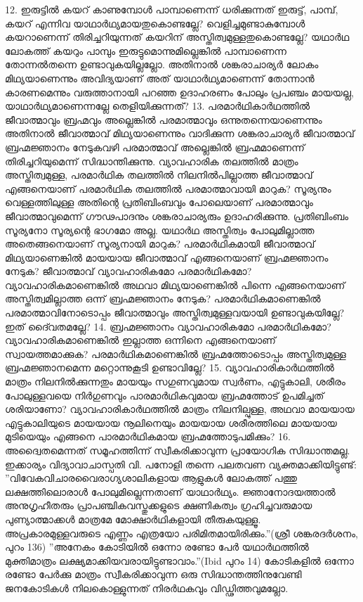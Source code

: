 12. ഇരുട്ടില്‍ കയറ് കാണുമ്പോള്‍ പാമ്പാണെന്ന് ധരിക്കുന്നത് ഇരുട്ട്, പാമ്പ്, കയറ് എന്നിവ യാഥാര്‍ഥ്യമായതുകൊണ്ടല്ലേ? വെളിച്ചമുണ്ടാകുമ്പോള്‍ കയറാണെന്ന് തിരിച്ചറിയുന്നത് കയറിന് അസ്തിത്വമുള്ളതുകൊണ്ടല്ലേ? യഥാര്‍ഥ ലോകത്ത് കയറും പാമ്പും ഇരുട്ടുമൊന്നുമില്ലെങ്കില്‍ പാമ്പാണെന്ന തോന്നല്‍തന്നെ ഉണ്ടാവുകയില്ലല്ലോ. അതിനാല്‍ ശങ്കരാചാര്യര്‍ ലോകം മിഥ്യയാണെന്നും അവിദ്യയാണ് അത് യാഥാര്‍ഥ്യമാണെന്ന് തോന്നാന്‍ കാരണമെന്നും വരുത്താനായി പറഞ്ഞ ഉദാഹരണം പോലും പ്രപഞ്ചം മായയല്ല, യാഥാര്‍ഥ്യമാണെന്നല്ലേ തെളിയിക്കുന്നത്?
13. പരമാര്‍ഥികാര്‍ഥത്തില്‍ ജീവാത്മാവും ബ്രഹ്മവും അല്ലെങ്കില്‍ പരമാത്മാവും ഒന്നുതന്നെയാണെന്നും അതിനാല്‍ ജീവാത്മാവ് മിഥ്യയാണെന്നും വാദിക്കുന്ന ശങ്കരാചാര്യര്‍ ജീവാത്മാവ് ബ്രഹ്മജ്ഞാനം നേടുകവഴി പരമാത്മാവ് അല്ലെങ്കില്‍ ബ്രഹ്മമാണെന്ന് തിരിച്ചറിയുമെന്ന് സിദ്ധാന്തിക്കുന്നു. വ്യാവഹാരിക തലത്തില്‍ മാത്രം അസ്തിത്വമുള്ള, പരമാര്‍ഥിക തലത്തില്‍ നിലനില്‍പില്ലാത്ത ജീവാത്മാവ് എങ്ങനെയാണ് പരമാര്‍ഥിക തലത്തില്‍ പരമാത്മാവായി മാറുക? സൂര്യനും വെള്ളത്തിലുള്ള അതിന്റെ പ്രതിബിംബവും പോലെയാണ് പരമാത്മാവും ജീവാത്മാവുമെന്ന് ഗൗഢപാദനും ശങ്കരാചാര്യരും ഉദാഹരിക്കുന്നു. പ്രതിബിംബം സൂര്യനോ സൂര്യന്റെ ഭാഗമോ അല്ല. യഥാര്‍ഥ അസ്തിത്വം പോലുമില്ലാത്ത അതെങ്ങനെയാണ് സൂര്യനായി മാറുക? പരമാര്‍ഥികമായി ജീവാത്മാവ് മിഥ്യയാണെങ്കില്‍ മായയായ ജീവാത്മാവ് എങ്ങനെയാണ് ബ്രഹ്മജ്ഞാനം നേടുക? ജീവാത്മാവ് വ്യാവഹാരികമോ പരമാര്‍ഥികമോ? വ്യാവഹാരികമാണെങ്കില്‍ അഥവാ മിഥ്യയാണെങ്കില്‍ പിന്നെ എങ്ങനെയാണ് അസ്തിത്വമില്ലാത്ത ഒന്ന് ബ്രഹ്മജ്ഞാനം നേടുക? പരമാര്‍ഥികമാണെങ്കില്‍ പരമാത്മാവിനോടൊപ്പം ജീവാത്മാവും അസ്തിത്വമുള്ളവയായി ഉണ്ടാവുകയില്ലേ? ഇത് ദൈ്വതമല്ലേ?
14. ബ്രഹ്മജ്ഞാനം വ്യാവഹാരികമോ പരമാര്‍ഥികമോ? വ്യാവഹാരികമാണെങ്കില്‍ ഇല്ലാത്ത ഒന്നിനെ എങ്ങനെയാണ് സ്വായത്തമാക്കുക? പരമാര്‍ഥികമാണെങ്കില്‍ ബ്രഹ്മത്തോടൊപ്പം അസ്തിത്വമുള്ള ബ്രഹ്മജ്ഞാനമെന്ന മറ്റൊന്നുകൂടി ഉണ്ടാവില്ലേ?
15. വ്യാവഹാരികാര്‍ഥത്തില്‍ മാത്രം നിലനില്‍ക്കുന്നതും മായയും സഗുണവുമായ സ്വര്‍ണം, എട്ടുകാലി, ശരീരം പോലുള്ളവയെ നിര്‍ഗുണവും പാരമാര്‍ഥികവുമായ ബ്രഹ്മത്തോട് ഉപമിച്ചത് ശരിയാണോ? വ്യാവഹാരികാര്‍ഥത്തില്‍ മാത്രം നിലനില്പുള്ള, അഥവാ മായയായ എട്ടുകാലിയുടെ മായയായ നൂലിനെയും മായയായ ശരീരത്തിലെ മായയായ മുടിയെയും എങ്ങനെ പാരമാര്‍ഥികമായ ബ്രഹ്മത്തോടുപമിക്കും?
16. അദ്വൈതമെന്നത് സമൂഹത്തിന്ന് സ്വീകരിക്കാവുന്ന പ്രായോഗിക സിദ്ധാന്തമല്ല. ഇക്കാര്യം വിദ്യാവാചാസ്പതി വി. പനോളി തന്നെ പലതവണ വ്യക്തമാക്കിയിട്ടുണ്ട്:
''വിവേകവിചാരവൈരാഗ്യശാലികളായ ആളുകള്‍ ലോകത്ത് പത്തു ലക്ഷത്തിലൊരാള്‍ പോലുമില്ലെന്നതാണ് യാഥാര്‍ഥ്യം. ജ്ഞാനോദയത്താല്‍ അനുഗൃഹീതരും പ്രാപഞ്ചികവസ്തുക്കളുടെ ക്ഷണികത്വം ഗ്രഹിച്ചവരുമായ പുണ്യാത്മാക്കള്‍ മാത്രമേ മോക്ഷാര്‍ഥികളായി തീരുകയുള്ളൂ. അപ്രകാരമുള്ളവരുടെ എണ്ണം എത്രയോ പരിമിതമായിരിക്കും.''(ശ്രീ ശങ്കരദര്‍ശനം, പുറം 136)
''അനേകം കോടിയില്‍ ഒന്നോ രണ്ടോ പേര്‍ യഥാര്‍ഥത്തില്‍ മുക്തിമാത്രം ലക്ഷ്യമാക്കിയവരായിട്ടുണ്ടാവാം.''(Ibid പുറം 14)
കോടികളില്‍ ഒന്നോ രണ്ടോ പേര്‍ക്കു മാത്രം സ്വീകരിക്കാവുന്ന ഒരു സിദ്ധാന്തത്തിനുവേണ്ടി ജനകോടികള്‍ നിലകൊള്ളുന്നത് നിരര്‍ഥകവും വിഡ്ഢിത്തവുമല്ലോ.
